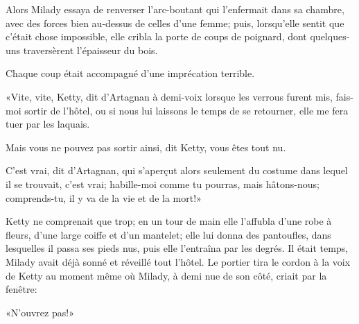 Alors Milady essaya de renverser l'arc-boutant qui l'enfermait dans sa chambre, avec des forces bien au-dessus de celles d'une femme; puis, lorsqu'elle sentit que c'était chose impossible, elle cribla la porte de coups de poignard, dont quelques-uns traversèrent l'épaisseur du bois. 

Chaque coup était accompagné d'une imprécation terrible. 

«Vite, vite, Ketty, dit d'Artagnan à demi-voix lorsque les verrous furent mis, fais-moi sortir de l'hôtel, ou si nous lui laissons le temps de se retourner, elle me fera tuer par les laquais. 

\speak  Mais vous ne pouvez pas sortir ainsi, dit Ketty, vous êtes tout nu. 

\speak  C'est vrai, dit d'Artagnan, qui s'aperçut alors seulement du costume dans lequel il se trouvait, c'est vrai; habille-moi comme tu pourras, mais hâtons-nous; comprends-tu, il y va de la vie et de la mort!» 

Ketty ne comprenait que trop; en un tour de main elle l'affubla d'une robe à fleurs, d'une large coiffe et d'un mantelet; elle lui donna des pantoufles, dans lesquelles il passa ses pieds nus, puis elle l'entraîna par les degrés. Il était temps, Milady avait déjà sonné et réveillé tout l'hôtel. Le portier tira le cordon à la voix de Ketty au moment même où Milady, à demi nue de son côté, criait par la fenêtre: 

«N'ouvrez pas!» 